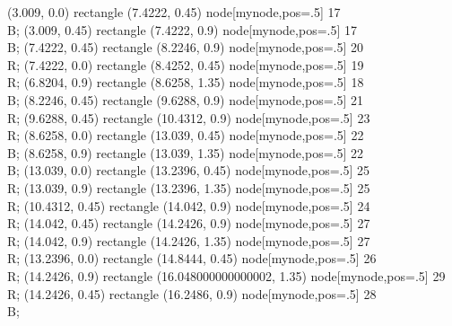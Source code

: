  (3.009, 0.0) rectangle (7.4222, 0.45) node[mynode,pos=.5] {17 \\ B};
 (3.009, 0.45) rectangle (7.4222, 0.9) node[mynode,pos=.5] {17 \\ B};
 (7.4222, 0.45) rectangle (8.2246, 0.9) node[mynode,pos=.5] {20 \\ R};
 (7.4222, 0.0) rectangle (8.4252, 0.45) node[mynode,pos=.5] {19 \\ R};
 (6.8204, 0.9) rectangle (8.6258, 1.35) node[mynode,pos=.5] {18 \\ B};
 (8.2246, 0.45) rectangle (9.6288, 0.9) node[mynode,pos=.5] {21 \\ R};
 (9.6288, 0.45) rectangle (10.4312, 0.9) node[mynode,pos=.5] {23 \\ R};
 (8.6258, 0.0) rectangle (13.039, 0.45) node[mynode,pos=.5] {22 \\ B};
 (8.6258, 0.9) rectangle (13.039, 1.35) node[mynode,pos=.5] {22 \\ B};
 (13.039, 0.0) rectangle (13.2396, 0.45) node[mynode,pos=.5] {25 \\ R};
 (13.039, 0.9) rectangle (13.2396, 1.35) node[mynode,pos=.5] {25 \\ R};
 (10.4312, 0.45) rectangle (14.042, 0.9) node[mynode,pos=.5] {24 \\ R};
 (14.042, 0.45) rectangle (14.2426, 0.9) node[mynode,pos=.5] {27 \\ R};
 (14.042, 0.9) rectangle (14.2426, 1.35) node[mynode,pos=.5] {27 \\ R};
 (13.2396, 0.0) rectangle (14.8444, 0.45) node[mynode,pos=.5] {26 \\ R};
 (14.2426, 0.9) rectangle (16.048000000000002, 1.35) node[mynode,pos=.5] {29 \\ R};
 (14.2426, 0.45) rectangle (16.2486, 0.9) node[mynode,pos=.5] {28 \\ B};